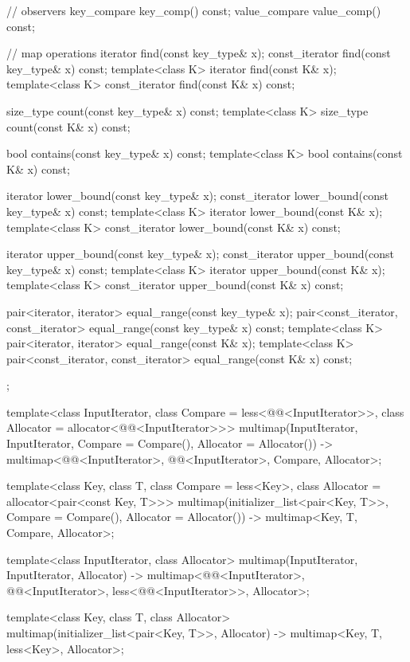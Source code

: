 \begin{codeblock}
{{    // observers
    key_compare key_comp() const;
    value_compare value_comp() const;

    // map operations
    iterator       find(const key_type& x);
    const_iterator find(const key_type& x) const;
    template<class K> iterator       find(const K& x);
    template<class K> const_iterator find(const K& x) const;

    size_type      count(const key_type& x) const;
    template<class K> size_type count(const K& x) const;

    bool           contains(const key_type& x) const;
    template<class K> bool contains(const K& x) const;

    iterator       lower_bound(const key_type& x);
    const_iterator lower_bound(const key_type& x) const;
    template<class K> iterator       lower_bound(const K& x);
    template<class K> const_iterator lower_bound(const K& x) const;

    iterator       upper_bound(const key_type& x);
    const_iterator upper_bound(const key_type& x) const;
    template<class K> iterator       upper_bound(const K& x);
    template<class K> const_iterator upper_bound(const K& x) const;

    pair<iterator, iterator>               equal_range(const key_type& x);
    pair<const_iterator, const_iterator>   equal_range(const key_type& x) const;
    template<class K>
      pair<iterator, iterator>             equal_range(const K& x);
    template<class K>
      pair<const_iterator, const_iterator> equal_range(const K& x) const;
  };

  template<class InputIterator, class Compare = less<@@<InputIterator>>,
           class Allocator = allocator<@@<InputIterator>>>
    multimap(InputIterator, InputIterator, Compare = Compare(), Allocator = Allocator())
      -> multimap<@@<InputIterator>, @@<InputIterator>,
                  Compare, Allocator>;

  template<class Key, class T, class Compare = less<Key>,
           class Allocator = allocator<pair<const Key, T>>>
    multimap(initializer_list<pair<Key, T>>, Compare = Compare(), Allocator = Allocator())
      -> multimap<Key, T, Compare, Allocator>;

  template<class InputIterator, class Allocator>
    multimap(InputIterator, InputIterator, Allocator)
      -> multimap<@@<InputIterator>, @@<InputIterator>,
                  less<@@<InputIterator>>, Allocator>;

  template<class Key, class T, class Allocator>
    multimap(initializer_list<pair<Key, T>>, Allocator)
      -> multimap<Key, T, less<Key>, Allocator>;
}
\end{codeblock}%
%


